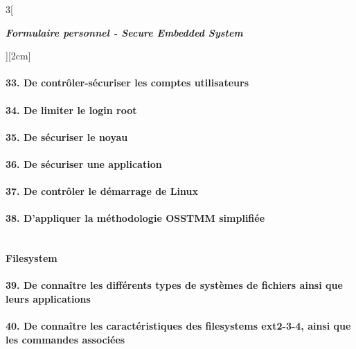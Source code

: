 \begin{multicols}{3}[\centerline{ \large\em \textbf{Formulaire personnel - Secure Embedded System}}][2cm]
\paragraph*{33. De contrôler-sécuriser les comptes utilisateurs\\}
\paragraph*{34. De limiter le login root\\}
\paragraph*{35. De sécuriser le noyau\\}
\paragraph*{36. De sécuriser une application\\}
\paragraph*{37. De contrôler le démarrage de Linux\\}
\paragraph*{38. D’appliquer la méthodologie OSSTMM simplifiée\\}
\begin{minipage}{\linewidth}
	\centering
\end{minipage}\\

{\Large \textbf{Filesystem}}\\
\paragraph*{39. De connaître les différents types de systèmes de fichiers ainsi que leurs applications\\}
\paragraph*{40. De connaître les caractéristiques des filesystems ext2-3-4, ainsi que les commandes associées\\}

\end{multicols}
